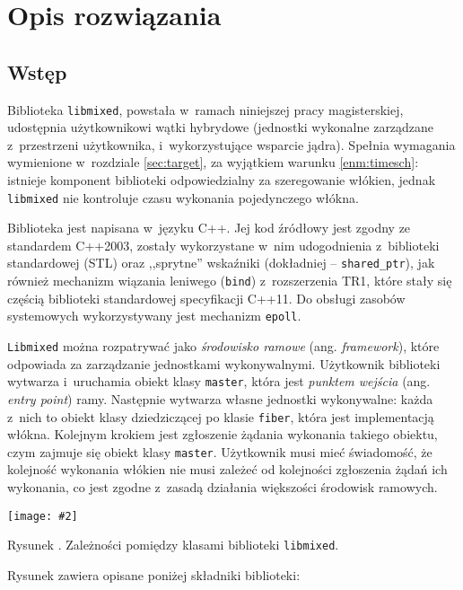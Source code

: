 \documentclass[12pt]{mwart}
\newcommand{\code}{\texttt}
\newcounter{figmain}
\newcommand{\myownfigure}[4]{ \newcounter{#1} \setcounter{#1}{\value{figmain}} \addtocounter{figmain}{1} \begin{center} \label{fig:#1} \centering \texttt{[image: \#2]}\\ \nopagebreak[5] \parbox[t]{11.5cm}{Rysunek \arabic{#1}. #3.} \end{center}}
\begin{document}
\section{Opis rozwiązania}
\label{sec:solution}
\subsection{Wstęp}
\indent 
  Biblioteka \code{libmixed}, powstała w~ramach niniejszej pracy magisterskiej, udostępnia użytkownikowi wątki hybrydowe (jednostki wykonalne zarządzane z~przestrzeni użytkownika,
  i~wykorzystujące wsparcie jądra). Spełnia wymagania wymienione w~rozdziale \ref{sec:target}, za wyjątkiem warunku \ref{enm:timesch}:
  istnieje komponent biblioteki odpowiedzialny za szeregowanie włókien, jednak \code{libmixed} nie kontroluje czasu wykonania pojedynczego włókna.
\par
\indent
  Biblioteka jest napisana w~języku C++. Jej kod źródłowy jest zgodny ze standardem C++2003, zostały wykorzystane w~nim udogodnienia z~biblioteki standardowej (STL)
  oraz ,,sprytne'' wskaźniki (dokładniej -- \code{shared\_ptr}), jak również mechanizm wiązania leniwego (\code{bind}) z~rozszerzenia TR1, które stały się częścią
  biblioteki standardowej specyfikacji C++11.
  Do obsługi zasobów systemowych wykorzystywany jest mechanizm \code{epoll}.
\par
\indent
  \code{Libmixed} można rozpatrywać jako \emph{środowisko ramowe} (ang. \emph{framework}), które odpowiada za zarządzanie jednostkami wykonywalnymi.
  Użytkownik biblioteki wytwarza i~uruchamia obiekt klasy \code{master}, która jest \emph{punktem wejścia} (ang. \emph{entry point}) ramy.
  Następnie wytwarza własne jednostki wykonywalne: każda z~nich to obiekt klasy dziedziczącej po klasie \code{fiber}, która jest implementacją włókna.
  Kolejnym krokiem jest zgłoszenie żądania wykonania takiego obiektu, czym zajmuje się obiekt klasy \code{master}.
  Użytkownik musi mieć świadomość, że kolejność wykonania włókien nie musi zależeć od kolejności zgłoszenia żądań ich wykonania, co jest zgodne z~zasadą działania
  większości środowisk ramowych.
\par
\begin{center}
  \myownfigure{libmixedoverview}{libmixedOverview.png}{Zależności pomiędzy klasami biblioteki \code{libmixed}}{.7}
\end{center}
%
\indent
  Rysunek  zawiera opisane poniżej składniki biblioteki:
\end{document}
